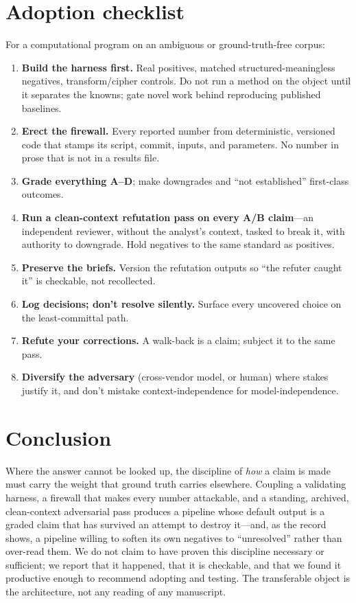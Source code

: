 \documentclass[11pt]{article}
\begin{document}
\section{Adoption checklist}
For a computational program on an ambiguous or ground-truth-free corpus:
\begin{enumerate}[leftmargin=1.4em,itemsep=1pt]
\item \textbf{Build the harness first.} Real positives, matched structured-meaningless
  negatives, transform/cipher controls. Do not run a method on the object until it separates
  the knowns; gate novel work behind reproducing published baselines.
\item \textbf{Erect the firewall.} Every reported number from deterministic, versioned code
  that stamps its script, commit, inputs, and parameters. No number in prose that is not in a
  results file.
\item \textbf{Grade everything A--D}; make downgrades and ``not established'' first-class
  outcomes.
\item \textbf{Run a clean-context refutation pass on every A/B claim}---an independent reviewer,
  without the analyst's context, tasked to break it, with authority to downgrade. Hold
  negatives to the same standard as positives.
\item \textbf{Preserve the briefs.} Version the refutation outputs so ``the refuter caught it''
  is checkable, not recollected.
\item \textbf{Log decisions; don't resolve silently.} Surface every uncovered choice on the
  least-committal path.
\item \textbf{Refute your corrections.} A walk-back is a claim; subject it to the same pass.
\item \textbf{Diversify the adversary} (cross-vendor model, or human) where stakes justify it,
  and don't mistake context-independence for model-independence.
\end{enumerate}

\section{Conclusion}
Where the answer cannot be looked up, the discipline of \emph{how} a claim is made must carry
the weight that ground truth carries elsewhere. Coupling a validating harness, a firewall that
makes every number attackable, and a standing, archived, clean-context adversarial pass
produces a pipeline whose default output is a graded claim that has survived an attempt to
destroy it---and, as the record shows, a pipeline willing to soften its own negatives to
``unresolved'' rather than over-read them. We do not claim to have proven this discipline
necessary or sufficient; we report that it happened, that it is checkable, and that we found
it productive enough to recommend adopting and testing. The transferable object is the
architecture, not any reading of any manuscript.
\end{document}
